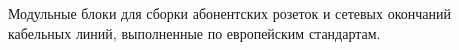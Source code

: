 Модульные блоки для сборки абонентских розеток и сетевых
окончаний кабельных линий, выполненные по европейским
стандартам.